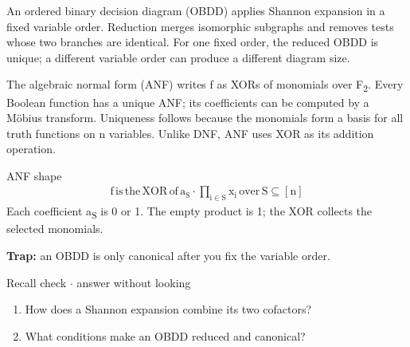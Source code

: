 \documentclass[11pt]{article}
\begin{document}
\begin{keepsection}
An ordered binary decision diagram (OBDD) applies Shannon expansion in a fixed variable order. Reduction merges isomorphic subgraphs and removes tests whose two branches are identical. For one fixed order, the reduced OBDD is unique; a different variable order can produce a different diagram size.

The algebraic normal form (ANF) writes f as XORs of monomials over F\textsubscript{2}. Every Boolean function has a unique ANF; its coefficients can be computed by a Möbius transform. Uniqueness follows because the monomials form a basis for all truth functions on n variables. Unlike DNF, ANF uses XOR as its addition operation.

\begin{equationcard}{ANF shape}
\[ \begin{gathered} \mathrm{f}\, \text{is}\, \text{the}\, \text{XOR}\, \text{of}\, \mathrm{a}_{\mathrm{S}}\cdot ∏_{\mathrm{i}\in \mathrm{S}}\mathrm{x}_{\mathrm{i}}\, \text{over}\, \mathrm{S}⊆[\mathrm{n}] \end{gathered} \]
{\small Each coefficient a\textsubscript{S} is 0 or 1. The empty product is 1; the XOR collects the selected monomials.}
\end{equationcard}

\begin{notebox}\textbf{Trap:} an OBDD is only canonical after you fix the variable order.\end{notebox}

\begin{recallbox}{Recall check \ensuremath{\cdot} answer without looking}
\begin{enumerate}
\item How does a Shannon expansion combine its two cofactors?
\item What conditions make an OBDD reduced and canonical?
\end{enumerate}

\end{recallbox}
\end{keepsection}
\end{document}

